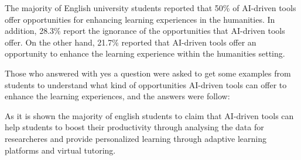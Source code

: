 \begin{figure}[h]
	\centering
\end{figure}
The majority of English university students reported that 50\% of AI-driven tools offer opportunities for enhancing learning experiences in the humanities.
In addition, 28.3\% report the ignorance of the opportunities that AI-driven tools offer.
On the other hand, 21.7\% reported that AI-driven tools offer an opportunity to enhance the learning experience within the humanities setting.

Those who answered with yes a question were asked to get some examples from students
to understand what kind of opportunities AI-driven tools can offer to enhance the learning experiences,
and the answers were follow:


As it is shown the majority of english students to claim that AI-driven tools can
help students to boost their productivity through analysing the data for researcheres
and provide personalized learning through adaptive learning platforms and virtual tutoring.

